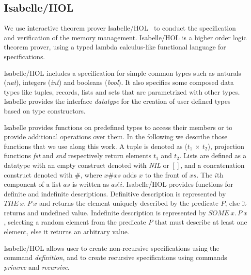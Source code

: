 \subsection{Isabelle/HOL}
We use interactive theorem prover Isabelle/HOL~\cite{reg_Isabelle/HOL} to conduct the specification and verification of the memory management. Isabelle/HOL is a higher order logic theorem prover, using a typed lambda calculus-like functional language for specifications.

Isabelle/HOL includes a specification for simple common types such as naturals (\emph{nat}), integers (\emph{int}) and booleans (\emph{bool}). It also specifies some composed data types like tuples, records, lists and sets that are parametrized with other types. Isabelle provides the interface \emph{datatype} for the creation of user defined types based on type constructors. 

Isabelle provides functions on predefined types to access their members or to provide additional operations over them. In the following we describe those functions that we use along this work. A tuple is denoted as (\emph{$t_1$} $\times$ \emph{$t_2$}), projection functions \emph{fst} and \emph{snd} respectively return elements $t_1$ and $t_2$. Lists are defined as a datatype with an empty construct denoted with \emph{NIL} or $[]$, and a concatenation construct denoted with $\#$, where $x\#xs$ adds $x$ to the front of $xs$. The $i$th component of a list $as$ is written as $as!i$. Isabelle/HOL provides functions for definite and indefinite descriptions. Definitive description is represented by $THE\ x.\ P\ x$ and returns the element uniquely described by the predicate $P$, else it returns and undefined value. Indefinite description is represented by $SOME\ x.\, P\ x$, selecting a random element from the predicate $P$ that must describe at least one element, else it returns an arbitrary value.

Isabelle/HOL allows user to create non-recursive specifications using the command \emph{definition}, and to create recursive specifications using commands \emph{primrec} and \emph{recursive}.

